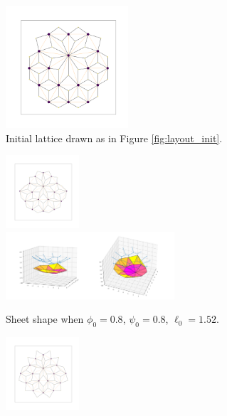 \documentclass[draft]{article}
\begin{document}
\begin{figure}[htbp]
    \centering
    \begin{subfigure}[b]{\textwidth}
        \centering
        \includegraphics[width=0.5\textwidth]{figures/numerical/kink/kink_graph.png}
        \caption{Initial lattice drawn as in Figure \ref{fig:layout_init}.}
        \label{subfig:kink_graph}
    \end{subfigure}
    \begin{subfigure}[b]{\textwidth}
        \centering
        \includegraphics[width=0.3\textwidth]{figures/numerical/kink/kink0.8_0.8_1.52_10_graph.png}
        \includegraphics[width=0.69\textwidth]{figures/numerical/kink/kink0.8_0.8_1.52_10_plot.png}
        \caption{Sheet shape when $\phi_0=0.8$, $\psi_0=0.8$, $\ell_0=1.52$.}
        \label{subfig:kink_in}
    \end{subfigure}
    \begin{subfigure}[b]{\textwidth}
        \centering
        \includegraphics[width=0.3\textwidth]{figures/numerical/kink/kink0.95_0.8_1.52_10_graph.png}

\end{subfigure}
\end{figure}
\end{document}
